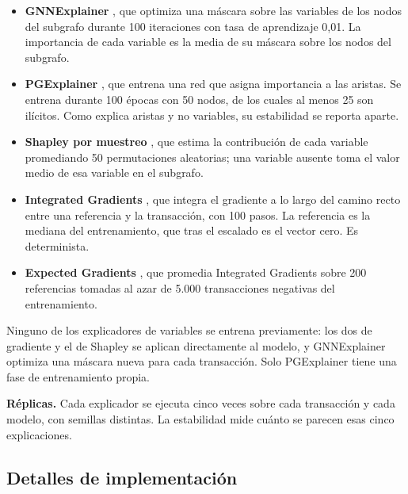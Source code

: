 \begin{itemize}
  \item \textbf{GNNExplainer} \cite{Ying2019GNNExplainer}, que optimiza una máscara sobre las
        variables de los nodos del subgrafo durante 100 iteraciones con tasa de aprendizaje
        0,01. La importancia de cada variable es la media de su máscara sobre los nodos del
        subgrafo.
  \item \textbf{PGExplainer} \cite{Luo2020PGExplainer}, que entrena una red que asigna
        importancia a las aristas. Se entrena durante 100 épocas con 50 nodos, de los cuales al
        menos 25 son ilícitos. Como explica aristas y no variables, su estabilidad se reporta
        aparte.
  \item \textbf{Shapley por muestreo} \cite{Strumbelj2014Explaining, Castro2009Polynomial},
        que estima la contribución de cada variable promediando 50 permutaciones aleatorias;
        una variable ausente toma el valor medio de esa variable en el subgrafo.
  \item \textbf{Integrated Gradients} \cite{Sundararajan2017IG}, que integra el gradiente a lo
        largo del camino recto entre una referencia y la transacción, con 100 pasos. La
        referencia es la mediana del entrenamiento, que tras el escalado es el vector cero. Es
        determinista.
  \item \textbf{Expected Gradients} \cite{Erion2021Expected}, que promedia Integrated
        Gradients sobre 200 referencias tomadas al azar de 5.000 transacciones negativas del
        entrenamiento.
\end{itemize}

Ninguno de los explicadores de variables se entrena previamente: los dos de gradiente y el de
Shapley se aplican directamente al modelo, y GNNExplainer optimiza una máscara nueva para cada
transacción. Solo PGExplainer tiene una fase de entrenamiento propia.

\textbf{Réplicas.} Cada explicador se ejecuta cinco veces sobre cada transacción y cada modelo,
con semillas distintas. La estabilidad mide cuánto se parecen esas cinco explicaciones.

\subsection*{Detalles de implementación}

